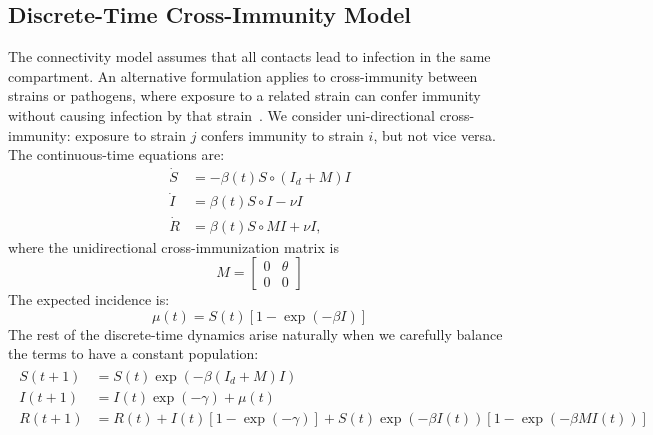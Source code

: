 \subsection*{Discrete-Time Cross-Immunity Model}

The connectivity model assumes that all contacts lead to infection in
the same compartment. An alternative formulation applies to
cross-immunity between strains or pathogens, where exposure to a
related strain can confer immunity without causing infection by that
strain~\citep{gog2002}. We consider uni-directional cross-immunity:
exposure to strain $j$ confers immunity to strain $i$, but not vice
versa. The continuous-time equations are:
\begin{align*}
  \dot{S} &= -\beta(t) S \circ (I_d + M) I \\
  \dot{I} &= \beta(t) S\circ I - \nu I\\
  \dot{R} &= \beta(t) S \circ MI + \nu I,
\end{align*}
where the unidirectional cross-immunization matrix is
\begin{equation*}
M =
\begin{bmatrix}
  0 & \theta \\
  0 & 0
\end{bmatrix}
\end{equation*}
The expected incidence is:
\begin{equation}\label{eq:cross_incidence}
\mu(t) = S(t) \left[1 - \exp(-\beta I) \right]
\end{equation}
The rest of the discrete-time dynamics arise naturally when we
carefully balance the terms to have a constant population:
\begin{align}\begin{split}\label{eq:discrete_cross}
S(t+1) &= S(t) \exp(-\beta (I_d + M)I) \\
I(t+1) &= I(t) \exp(-\gamma) + \mu(t) \\
R(t+1) &= R(t) + I(t) [1 - \exp(-\gamma)] + S(t)\exp(-\beta I(t))[1-\exp(-\beta MI(t))]
\end{split}\end{align}

